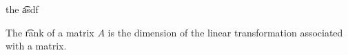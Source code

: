 


the \t{asdf}

The \t{rank} of a matrix $A$ is the dimension of the linear transformation associated with a matrix.
